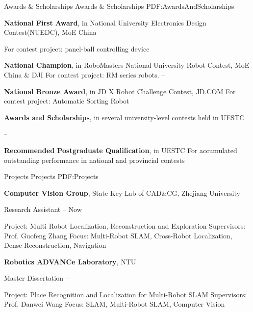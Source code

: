 \documentclass[letterpaper,MMMyyyy,nonstopmode]{simpleresumecv}
\begin{document}
\begin{Body}

\Section
{Awards \&\newline
	Scholarships}
{Awards \& Scholarships}
{PDF:AwardsAndScholarships}

\Entry
\textbf{National First Award},
in National University Electronics Design Contest(NUEDC), 
MoE China

\BulletItem
For contest project: panel-ball controlling device
\hfill
{}

\Gap
\Entry
\textbf{National Champion},
in RoboMasters National University Robot Contest,
MoE China \& DJI
\BulletItem
For contest project: RM series robots.
\hfill
{} --

\Gap
\Entry
\textbf{National Bronze Award},
in JD X Robot Challenge Contest,
JD.COM
\BulletItem
For contest project: Automatic Sorting Robot
\hfill
{}

\Gap
\Entry
\textbf{Awards and Scholarships}, 
in several university-level contests held in UESTC

\hfill
{} --

\Gap
\Entry
\textbf{Recommended Postgraduate Qualification},
in UESTC
\BulletItem
For accumulated outstanding performance in national and provincial contests
\hfill
{}



\Section
{Projects}
{Projects}
{PDF:Projects}

\Entry
{\textbf{Computer Vision Group}},
State Key Lab of CAD\&CG, Zhejiang University

\BulletItem
Research Assistant
\hfill
{} --
Now
\begin{Detail}
\SubBulletItem
Project:
Multi Robot Localization, Reconstruction and Exploration
\SubBulletItem
Supervisors:
Prof. Guofeng Zhang
\SubBulletItem
Focus:
Multi-Robot SLAM, Cross-Robot Localization, Dense Reconstruction, Navigation
\end{Detail}

\Gap
\Entry
{\textbf{Robotics ADVANCe Laboratory}},
NTU

\BulletItem
Master Dissertation
\hfill
{} --
\begin{Detail}
\SubBulletItem
Project:
Place Recognition and Localization for Multi-Robot SLAM \cite{xiangyu2019quantitative}
\SubBulletItem
Supervisors:
Prof. Danwei Wang
\SubBulletItem
Focus:
SLAM, Multi-Robot SLAM, Computer Vision
\end{Detail}


\end{Body}
\end{document}
